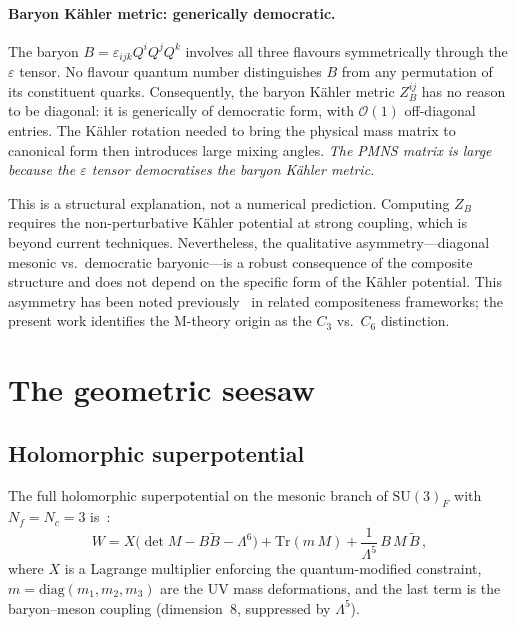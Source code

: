 \documentclass[aps,prd,twocolumn,showpacs,preprintnumbers,superscriptaddress,floatfix]{revtex4-2}
\newcommand{\SU}{\mathrm{SU}}
\newcommand{\Nf}{N_{\!f}}
\newcommand{\Nc}{N_{\!c}}
\newcommand{\Tr}{\mathrm{Tr}}
\newcommand{\diag}{\mathrm{diag}}
\begin{document}
\paragraph{Baryon K\"ahler metric: generically democratic.}
The baryon $B = \varepsilon_{ijk}Q^iQ^jQ^k$ involves all three
flavours symmetrically through the $\varepsilon$ tensor.
No flavour quantum number distinguishes $B$ from any
permutation of its constituent quarks.
Consequently, the baryon K\"ahler metric $Z_B^{ij}$ has no reason
to be diagonal: it is generically of democratic form, with
$\mathcal{O}(1)$ off-diagonal entries.
The K\"ahler rotation needed to bring the physical mass matrix to
canonical form then introduces large mixing angles.
\emph{The PMNS matrix is large because the $\varepsilon$ tensor
democratises the baryon K\"ahler metric.}

This is a structural explanation, not a numerical prediction.
Computing $Z_B$ requires the non-perturbative K\"ahler potential
at strong coupling, which is beyond current techniques.
Nevertheless, the qualitative asymmetry---diagonal mesonic vs.\
democratic baryonic---is a robust consequence of the composite
structure and does not depend on the specific form of the
K\"ahler potential.
This asymmetry has been noted
previously~\cite{MasieroVeneziano:1985,Karasik:2020}
in related compositeness frameworks;
the present work identifies the M-theory origin as the
$C_3$ vs.\ $C_6$ distinction.


\section{The geometric seesaw}
\label{sec:seesaw}

\subsection{Holomorphic superpotential}

The full holomorphic superpotential on the mesonic branch of
$\SU(3)_F$ with $\Nf = \Nc = 3$
is~\cite{Seiberg:1994bz,CsakiSchmaltzSkiba:1997}:
\begin{equation}
  W = X\bigl(\det M - B\tilde{B} - \Lambda^6\bigr)
    + \Tr(m\,M) + \frac{1}{\Lambda^5}\,B\,M\,\tilde{B}\,,
  \label{eq:superpotential}
\end{equation}
where $X$ is a Lagrange multiplier enforcing the
quantum-modified constraint, $m = \diag(m_1, m_2, m_3)$ are the
UV mass deformations, and the last term is the baryon--meson
coupling (dimension~8, suppressed by $\Lambda^5$).
\end{document}
